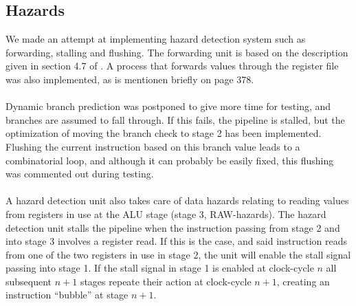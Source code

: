 \subsection{Hazards}
We made an attempt at implementing hazard detection system such as forwarding, stalling and flushing. The forwarding unit is based on
the description given in section 4.7 of \cite{patterson12}. A process that
forwards values through the register file was also implemented, as is mentionen
briefly on page  378.
\paragraph*{}
Dynamic branch prediction was postponed to give more time for testing, and
branches are assumed to fall through. If this fails, the pipeline
is stalled, but the optimization of moving the branch check to stage 2 has been
implemented. Flushing the current instruction based on this branch value leads
to a combinatorial loop, and although it can probably be easily fixed, this
flushing was commented out during testing.
\paragraph*{}
A hazard detection unit also takes care of data hazards relating to reading
values from registers in use at the ALU stage (stage 3, RAW-hazards). The
hazard detection unit stalls the pipeline when the instruction passing from
stage 2 and into stage 3 involves a register read. If this is the case, and said
instruction reads from one of the two registers in use in stage 2, the unit will
enable the stall signal passing into stage 1. If the stall signal in stage 1 is
enabled at clock-cycle $n$ all subsequent $n+1$
stages repeate their action at clock-cycle $n+1$, creating an instruction
``bubble'' at stage $n+1$.

